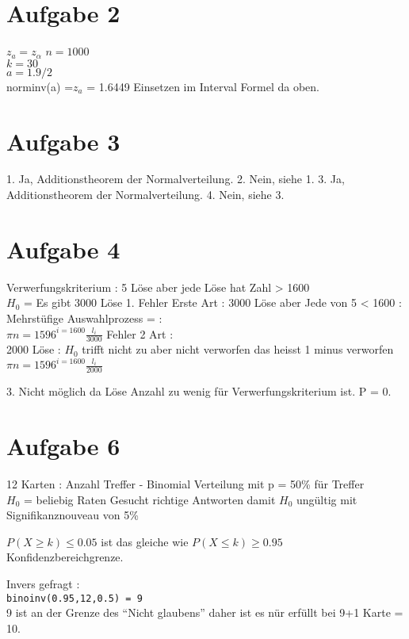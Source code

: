 \documentclass[a4paper,10pt]{scrbook}
\begin{document}
\section*{Aufgabe 2}
$z_a = z_\alpha$
$ n = 1000$\\
$ k = 30$\\
$ a = 1.9/2$ \\
norminv(a) =$ z_a$ = 1.6449
Einsetzen im Interval Formel da oben.


\section*{Aufgabe 3}
1. Ja, Additionstheorem der Normalverteilung.
2. Nein, siehe 1.
3. Ja, Additionstheorem der Normalverteilung.
4. Nein, siehe 3.

\section*{Aufgabe 4}
Verwerfungskriterium : 5 Löse aber jede Löse hat Zahl > 1600\\
$H_0$ = Es gibt 3000 Löse
1. Fehler Erste Art : 3000 Löse aber Jede von 5 < 1600 : Mehrstüfige Auswahlprozess = : \\
$\pi{n=1596}^{i=1600} \frac{l_i}{3000}$
Fehler 2 Art :\\
2000 Löse : $H_0$ trifft nicht zu aber nicht verworfen das heisst 1 minus verworfen\\
$\pi{n=1596}^{i=1600} \frac{l_i}{2000}$

3. Nicht möglich da Löse Anzahl zu wenig für Verwerfungskriterium ist. P = 0.

\section*{Aufgabe 6}
12 Karten : Anzahl Treffer - Binomial Verteilung mit p = 50\% für Treffer \\
$H_0$ = beliebig Raten
Gesucht richtige Antworten damit $H_0$ ungültig mit Signifikanznouveau  von 5\% \\

\begin{framed}
 $P(X \ge k) \le 0.05$ ist das gleiche wie $P(X \le k) \ge 0.95$ \\
 Konfidenzbereichgrenze.
\end{framed}
Invers gefragt : \\
\texttt{binoinv(0.95,12,0.5) = 9}\\
9 ist an der Grenze des ``Nicht glaubens'' daher ist es nür erfüllt bei 9+1 Karte = 10.
\end{document}
